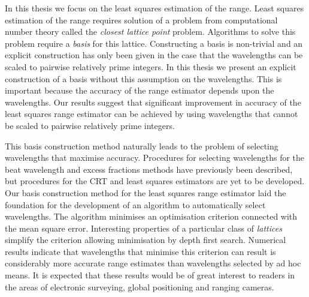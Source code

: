 In this thesis we focus on the least squares estimation of the range. Least squares estimation of the range requires solution of a problem from computational number theory called the \emph{closest lattice point} problem.  Algorithms to solve this problem require a \emph{basis} for this lattice.  Constructing a basis is non-trivial and an explicit construction has only been given in the case that the wavelengths can be scaled to pairwise relatively prime integers.  In this thesis we present an explicit construction of a basis without this assumption on the wavelengths.  This is important because the accuracy of the range estimator depends upon the wavelengths.  Our results suggest that significant improvement in accuracy of the least squares range estimator can be achieved by using wavelengths that cannot be scaled to pairwise relatively prime integers.
 
This basis construction method naturally leads to the problem of selecting wavelengths that maximise accuracy.  Procedures for selecting wavelengths for the beat wavelength and excess fractions methods have previously been described, but procedures for the CRT and least squares estimators are yet to be developed.  Our basis construction method for the least squares range estimator laid the foundation for the development of an algorithm to automatically select wavelengths. The algorithm minimises an optimisation criterion connected with the mean square error. Interesting properties of a particular class of \emph{lattices} simplify the criterion allowing minimisation by depth first search.  Numerical results indicate that wavelengths that minimise this criterion can result is considerably more accurate range estimates than wavelengths selected by ad hoc means. It is expected that these results would be of great interest to readers in the areas of electronic surveying, global positioning and ranging cameras. 